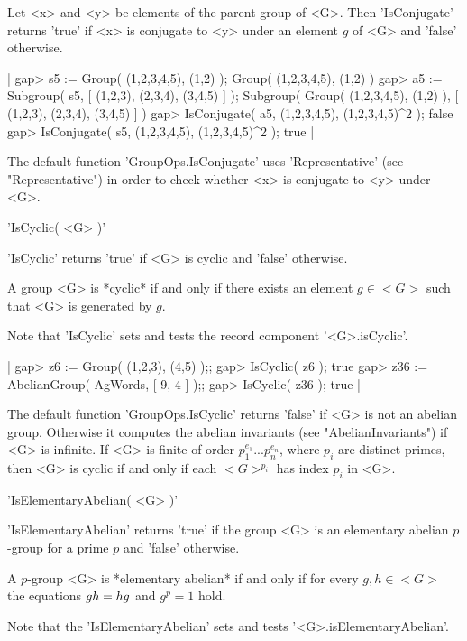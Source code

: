 Let   <x>  and <y>   be  elements  of the  parent   group of    <G>. Then
'IsConjugate' returns 'true' if <x> is conjugate  to <y> under an element
$g$ of <G> and 'false' otherwise.

|    gap> s5 := Group( (1,2,3,4,5), (1,2) );
    Group( (1,2,3,4,5), (1,2) )
    gap> a5 := Subgroup( s5, [ (1,2,3), (2,3,4), (3,4,5) ] );
    Subgroup( Group( (1,2,3,4,5), (1,2) ), [ (1,2,3), (2,3,4), (3,4,5) ] )
    gap> IsConjugate( a5, (1,2,3,4,5), (1,2,3,4,5)^2 );
    false
    gap> IsConjugate( s5, (1,2,3,4,5), (1,2,3,4,5)^2 );
    true |

The  default  function  'GroupOps.IsConjugate' uses 'Representative' (see
"Representative") in order to check whether <x> is conjugate to <y> under
<G>.


'IsCyclic( <G> )'

'IsCyclic' returns 'true' if <G> is cyclic and 'false' otherwise.

A group <G> is *cyclic* if and only if there exists an element $g\in <G>$
such that <G> is generated by $g$.

Note that 'IsCyclic' sets and tests the record  component '<G>.isCyclic'.

|    gap> z6 := Group( (1,2,3), (4,5) );;
    gap> IsCyclic( z6 );
    true
    gap> z36 := AbelianGroup( AgWords, [ 9, 4 ] );;
    gap> IsCyclic( z36 );
    true |

The default function 'GroupOps.IsCyclic' returns 'false' if <G> is not an
abelian  group.   Otherwise   it computes  the   abelian  invariants (see
"AbelianInvariants") if <G>  is infinite.   If   <G> is  finite of  order
$p_1^{e_1} ... p_n^{e_n}$, where $p_i$  are distinct primes, then  <G> is
cyclic if and only if each $<G>^{p_i}$ has index $p_i$ in <G>.


'IsElementaryAbelian( <G> )'

'IsElementaryAbelian' returns  'true' if  the group  <G> is an elementary
abelian $p$-group for a prime $p$ and 'false' otherwise.

A $p$-group <G> is *elementary abelian* if and only if for every $g, h\in
<G>$ the equations $g\* h = h\* g$ and $g^p = 1$ hold.

Note       that    the     'IsElementaryAbelian'     sets   and     tests
'<G>.isElementaryAbelian'.

